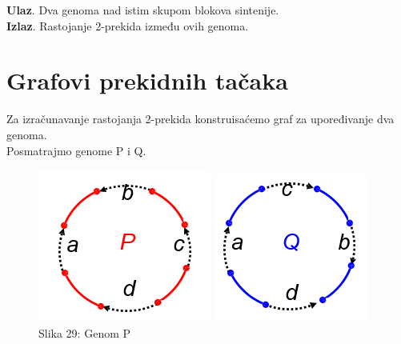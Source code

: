 \documentclass{article}
\begin{document}
\textbf{Ulaz}. Dva genoma nad istim skupom blokova
sintenije. \\

\textbf{Izlaz}. Rastojanje 2-prekida između ovih genoma.\\

\newpage
\section{Grafovi prekidnih tačaka}
\indent Za izračunavanje rastojanja 2-prekida konstruisaćemo graf za upoređivanje dva genoma.\\

Posmatrajmo genome {\color{red}P} i {\color{blue}Q}.

\begin{figure}[h!]
  \includegraphics[width=\linewidth]{slike/P.PNG}
  \caption{Slika 29: Genom P}
\endminipage\hfill
{}
  \includegraphics[width=\linewidth]{slike/Q.PNG}

\end{figure}
\end{document}
